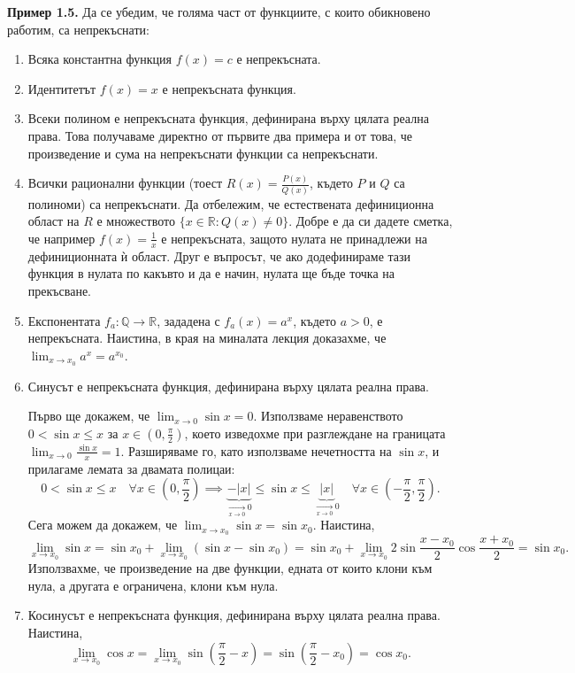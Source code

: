 \noindent\textbf{Пример 1.5.} Да се убедим, че голяма част от функциите, с които обикновено работим, са непрекъснати:
\begin{enumerate}
    \item Всяка константна функция $f(x) = c$ е непрекъсната.
    \item Идентитетът $f(x) = x$ е непрекъсната функция.
    \item Всеки полином е непрекъсната функция, дефинирана върху цялата реална права. Това получаваме директно от първите два примера и от това, че произведение и сума на непрекъснати функции са непрекъснати.
    \item Всички рационални функции (тоест $R(x) = \frac{P(x)}{Q(x)}$, където $P$ и $Q$ са полиноми) са непрекъснати. Да отбележим, че естествената дефиниционна област на $R$ е множеството $\{x \in \mathbb{R} : Q(x) \neq 0\}$. Добре е да си дадете сметка, че например $f(x) = \frac{1}{x}$ е непрекъсната, защото нулата не принадлежи на дефиниционната ѝ област. Друг е въпросът, че ако додефинираме тази функция в нулата по какъвто и да е начин, нулата ще бъде точка на прекъсване.
    \item Експонентата $f_a : \mathbb{Q} \to \mathbb{R}$, зададена с $f_a(x) = a^x$, където $a > 0$, е непрекъсната. Наистина, в края на миналата лекция доказахме, че $\lim_{x \to x_0} a^x = a^{x_0}$.
    \item Синусът е непрекъсната функция, дефинирана върху цялата реална права.
    
    Първо ще докажем, че $\lim_{x \to 0} \sin x = 0$. Използваме неравенството $0 < \sin x \le x$ за $x \in \left(0, \frac{\pi}{2}\right)$, което изведохме при разглеждане на границата $\lim_{x \to 0} \frac{\sin x}{x} = 1$. Разширяваме го, като използваме нечетността на $\sin x$, и прилагаме лемата за двамата полицаи:
    \[
    0 < \sin x \le x \quad \forall x \in \left(0, \frac{\pi}{2}\right) \implies \underbrace{-|x|}_{\xrightarrow[x \to 0]{} 0} \le \sin x \le \underbrace{|x|}_{\xrightarrow[x \to 0]{} 0} \quad \forall x \in \left(-\frac{\pi}{2}, \frac{\pi}{2}\right).
    \]
    Сега можем да докажем, че $\lim_{x \to x_0} \sin x = \sin x_0$. Наистина,
    \[
    \lim_{x \to x_0} \sin x = \sin x_0 + \lim_{x \to x_0} (\sin x - \sin x_0) = \sin x_0 + \lim_{x \to x_0} 2 \sin \frac{x - x_0}{2} \cos \frac{x + x_0}{2} = \sin x_0.
    \]
    Използвахме, че произведение на две функции, едната от които клони към нула, а другата е ограничена, клони към нула.
    \item Косинусът е непрекъсната функция, дефинирана върху цялата реална права. Наистина,
    \[
    \lim_{x \to x_0} \cos x = \lim_{x \to x_0} \sin\left(\frac{\pi}{2} - x\right) = \sin\left(\frac{\pi}{2} - x_0\right) = \cos x_0.
    \]
\end{enumerate}

